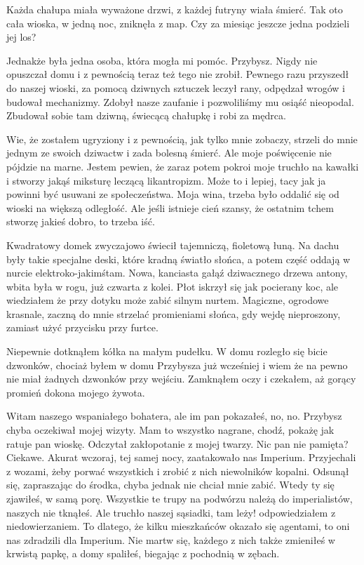 Każda chałupa miała wyważone drzwi, z każdej futryny wiała śmierć.
Tak oto cała wioska, w jedną noc, zniknęła z map.
Czy za miesiąc jeszcze jedna podzieli jej los? 

Jednakże była jedna osoba, która mogła mi pomóc.
Przybysz. Nigdy nie opuszczał domu i z pewnością teraz też tego nie zrobił.
Pewnego razu przyszedł do naszej wioski, za pomocą dziwnych sztuczek leczył rany, odpędzał wrogów i budował mechanizmy.
Zdobył nasze zaufanie i pozwoliliśmy mu osiąść nieopodal. Zbudował sobie tam dziwną, świecącą chałupkę i robi za mędrca.

Wie, że zostałem ugryziony i z pewnością, jak tylko mnie zobaczy, strzeli do mnie jednym ze swoich dziwactw i zada bolesną śmierć.
Ale moje poświęcenie nie pójdzie na marne. Jestem pewien, że zaraz potem pokroi moje truchło na kawałki i stworzy jakąś miksturę leczącą likantropizm.
Może to i lepiej, tacy jak ja powinni być usuwani ze społeczeństwa. Moja wina, trzeba było oddalić się od wioski na większą odległość.
Ale jeśli istnieje cień szansy, że ostatnim tchem stworzę jakieś dobro, to trzeba iść.

\divider{}

Kwadratowy domek zwyczajowo świecił tajemniczą, fioletową łuną.
Na dachu były takie specjalne deski, które kradną światło słońca, a potem część oddają w nurcie elektroko-jakimśtam.
Nowa, kanciasta gałąź dziwacznego drzewa antony, wbita była w rogu, już czwarta z kolei.
Płot iskrzył się jak pocierany koc, ale wiedziałem że przy dotyku może zabić silnym nurtem.
Magiczne, ogrodowe krasnale, zaczną do mnie strzelać promieniami słońca, gdy wejdę nieproszony, zamiast użyć przycisku przy furtce.

Niepewnie dotknąłem kółka na małym pudełku. 
W domu rozległo się bicie dzwonków, chociaż byłem w domu Przybysza już wcześniej i wiem że na pewno nie miał żadnych dzwonków przy wejściu.
Zamknąłem oczy i czekałem, aż gorący promień dokona mojego żywota.

\begin{dialogue}
\ds{} Witam naszego wspaniałego bohatera, ale im pan pokazałeś, no, no. 
\dm{} Przybysz chyba oczekiwał mojej wizyty. \dm{} Mam to wszystko nagrane, chodź, pokażę jak ratuje pan wioskę.
\dm{} Odczytał zakłopotanie z mojej twarzy.
\dm{} Nic pan nie pamięta? Ciekawe. Akurat wczoraj, tej samej nocy, zaatakowało nas Imperium.
Przyjechali z wozami, żeby porwać wszystkich i zrobić z nich niewolników kopalni.
\dm{} Odsunął się, zapraszając do środka, chyba jednak nie chciał mnie zabić.
\dm{} Wtedy ty się zjawiłeś, w samą porę. Wszystkie te trupy na podwórzu należą do imperialistów, naszych nie tknąłeś.
\ds{} Ale truchło naszej sąsiadki, tam leży! \dm{} odpowiedziałem z niedowierzaniem.
\ds{} To dlatego, że kilku mieszkańców okazało się agentami, to oni nas zdradzili dla Imperium. 
Nie martw się, każdego z nich także zmieniłeś w krwistą papkę, a domy spaliłeś, biegając z pochodnią w zębach.
\end{dialogue}

